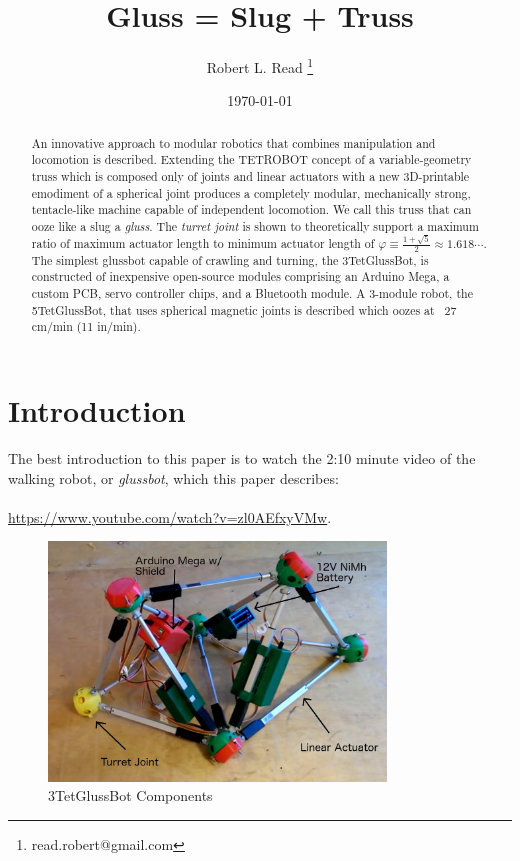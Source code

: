 \documentclass[11pt]{article}
\title{Gluss = Slug + Truss}
\author{Robert L. Read
  \thanks{read.robert@gmail.com}
}
\affil{Founder, Public Invention, an educational non-profit.}
\date{\today}
\begin{document}
\maketitle


\begin{abstract}
  An innovative approach to modular robotics that combines manipulation and locomotion is described.
  Extending the TETROBOT\cite{sanderson1996modular,lee2002dynamic,lee1999dynamics} concept of a variable-geometry
  truss which is composed only of joints and linear actuators
  with a new 3D-printable emodiment of a
  spherical joint\cite{song2003spherical}
  produces a completely modular, mechanically strong, tentacle-like machine capable of independent locomotion.
  We call this truss that can ooze like a slug a \emph{gluss}.
  The \emph{turret joint} is shown to theoretically support a maximum ratio of maximum actuator length to
  minimum actuator length of  $\varphi \equiv \frac{1 + \sqrt{5}}{2} \approx 1.618 \cdots$.
  The simplest glussbot capable of crawling and turning, the 3TetGlussBot, is constructed of
  inexpensive open-source modules comprising an Arduino Mega, a custom PCB, servo controller chips, and a Bluetooth module.
  A 3-module robot, the 5TetGlussBot, that uses spherical magnetic joints is described which oozes at ~27 cm/min (11 in/min).
\end{abstract}

\section{Introduction}

The best introduction to this paper is to watch the 2:10 minute video of the
walking robot, or \emph{glussbot}, which this paper describes:\\
\\
\indent \url{https://www.youtube.com/watch?v=zl0AEfxyVMw}.\\

\begin{figure}[!ht]
  \centering
    \includegraphics[width=0.8\textwidth]{figureslowres/3TetGlussBotPhotoAnnotated.jpg}
    \caption[3TetGlussBot Components]{3TetGlussBot Components}
      \label{annotated}
\end{figure}
\end{document}
